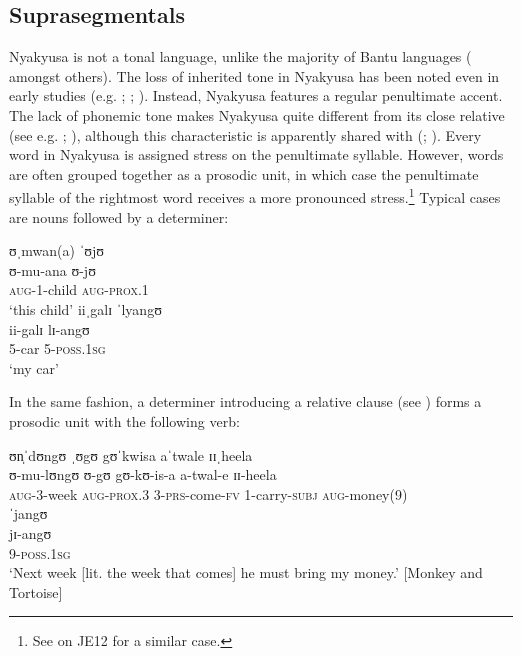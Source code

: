 \subsection{Suprasegmentals}\label{Stress} 
Nyakyusa is not a tonal language, unlike the majority of Bantu languages (\citealt{KisseberthCOddenD2003} amongst others). The loss of inherited tone in Nyakyusa has been noted even in early studies (e.g. \citealt{NurseD1979}; \citealt{GuthrieM1967}; \citealt{vanEssenOKaehler-MeyerE1969}). Instead, Nyakyusa features a regular penultimate accent. The lack of phonemic tone makes Nyakyusa quite different from its close relative  (see e.g. \citealt{NurseD1988}; \citealt{BotneR2008}), although this characteristic is apparently shared with  (\citealt{KishindoP1999}; \citealt{LabroussiC1999}). Every word in Nyakyusa is assigned stress on the penultimate syllable. However, words are often grouped together as a prosodic unit, in which case the penultimate syllable of the rightmost word receives a more pronounced stress.\footnote{See \citet{BickmoreLClemensL2016} on  JE12 for a similar case.} Typical cases are nouns followed by a determiner:
\begin{exe}
	\ex
	\glll ʊˌmwan(a) ˈʊjʊ\\
	ʊ-mu-ana ʊ-jʊ\\
	\textsc{aug}-1-child \textsc{aug}-\textsc{prox.1}\\
	\glt `this child'
	\ex
	\glll iiˌgalɪ ˈlyangʊ\\
	ii-galɪ lɪ-angʊ\\
	5-car 5-\textsc{poss.1sg}\\
	\glt \lq my car'
\end{exe}

In the same fashion, a determiner introducing a relative clause (see ) forms a prosodic unit with the following verb:
\begin{exe}
	\ex \glll ʊn̩ˈdʊngʊ ˌʊgʊ gʊˈkwisa aˈtwale ɪɪˌheela \\
	ʊ-mu-lʊngʊ ʊ-gʊ gʊ-kʊ-is-a a-twal-e ɪɪ-heela\\
	\textsc{aug}-3-week \textsc{aug}-\textsc{prox.3} 3-\textsc{prs}-come-\textsc{fv} 1-carry-\textsc{subj} \textsc{aug}-money(9)\\
	\sn \glll ˈjangʊ\\
	jɪ-angʊ\\
	9-\textsc{poss.1sg}\\
	\glt `Next week [lit. the week that comes] he must bring my money.' [Monkey and Tortoise]
\end{exe}
